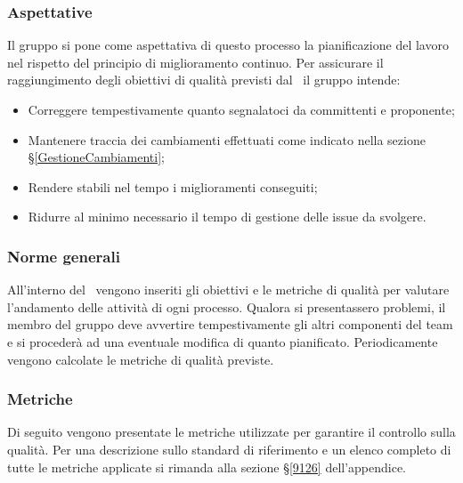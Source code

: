 \subsubsection{Aspettative}\label{AspettativeMiglioramento}
Il gruppo si pone come aspettativa di questo processo la pianificazione del lavoro nel rispetto del principio di miglioramento continuo. Per assicurare il raggiungimento degli obiettivi di qualità previsti dal \PdQ\ il gruppo intende:
\begin{itemize}
	\item Correggere tempestivamente quanto segnalatoci da committenti e proponente;
	\item Mantenere traccia dei cambiamenti effettuati come indicato nella sezione \S\ref{GestioneCambiamenti};
	\item Rendere stabili nel tempo i miglioramenti conseguiti;
	\item Ridurre al minimo necessario il tempo di gestione delle issue da svolgere.
\end{itemize}

\subsubsection{Norme generali}\label{PO_NormeGenerali}
All'interno del \PdQ\ vengono inseriti gli obiettivi e le metriche di qualità per valutare l'andamento delle attività di ogni processo. Qualora si presentassero problemi, il membro del gruppo deve avvertire tempestivamente gli altri componenti del team e si procederà ad una eventuale modifica di quanto pianificato. Periodicamente vengono calcolate le metriche di qualità previste.
\subsubsection{Metriche}\label{MMiglioramento}
Di seguito vengono presentate le metriche utilizzate per garantire il controllo sulla qualità. Per una descrizione sullo standard di riferimento e un elenco completo di tutte le metriche applicate si rimanda alla sezione \S\ref{9126} dell'appendice. 


